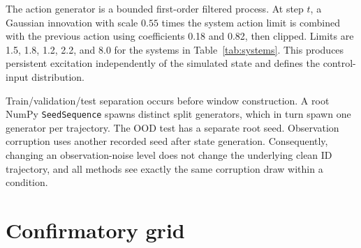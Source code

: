 \documentclass[iicol,pdflatex,sn-basic,Numbered]{sn-jnl}
\begin{document}
\begin{appendices}
\begin{table}[ht]
\centering
\scriptsize
\caption{Complete independently sampled physical-parameter intervals. Symbols
follow Table~\ref{tab:systems}; $g_u$ is the Van der Pol control gain.}
\label{tab:parameter-ranges}
\end{table}

The action generator is a bounded first-order filtered process. At step $t$, a Gaussian innovation with scale $0.55$ times the system action limit is combined with the previous action using coefficients 0.18 and 0.82, then clipped. Limits are 1.5, 1.8, 1.2, 2.2, and 8.0 for the systems in Table~\ref{tab:systems}. This produces persistent excitation independently of the simulated state and defines the control-input distribution.

Train/validation/test separation occurs before window construction. A root NumPy \texttt{SeedSequence} spawns distinct split generators, which in turn spawn one generator per trajectory. The OOD test has a separate root seed. Observation corruption uses another recorded seed after state generation. Consequently, changing an observation-noise level does not change the underlying clean ID trajectory, and all methods see exactly the same corruption draw within a condition.

\section{Confirmatory grid}


\end{appendices}
\end{document}
